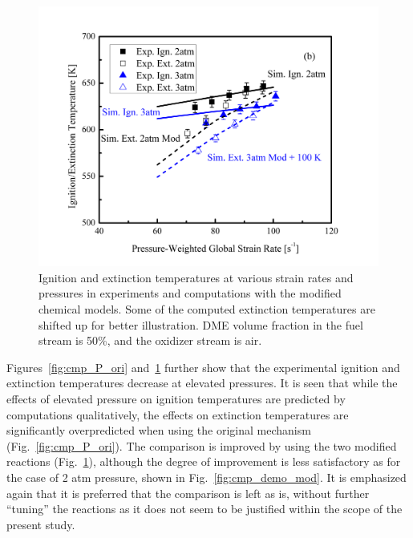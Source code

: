 \begin{figure}[t]
  \centering
  \scriptsize
  \includegraphics[width=1.0\textwidth]{ch-NTC/cmp_P_mod.png}
  \normalsize
  \caption{Ignition and extinction temperatures at various strain rates and pressures in experiments and computations with the modified chemical models.  Some of the computed extinction temperatures are shifted up for better illustration.  DME volume fraction in the fuel stream is 50\%, and the oxidizer stream is air.}
  \label{fig:cmp_P_mod}
\end{figure}

Figures~\ref{fig:cmp_P_ori} and~\ref{fig:cmp_P_mod} further show that the experimental ignition and extinction temperatures decrease at elevated pressures.  It is seen that while the effects of elevated pressure on ignition temperatures are predicted by computations qualitatively, the effects on extinction temperatures are significantly overpredicted when using the original mechanism (Fig.~\ref{fig:cmp_P_ori}).  The comparison is improved by using the two modified reactions (Fig.~\ref{fig:cmp_P_mod}), although the degree of improvement is less satisfactory as for the case of 2 atm pressure, shown in Fig.~\ref{fig:cmp_demo_mod}. It is emphasized again that it is preferred that the comparison is left as is, without further “tuning” the reactions as it does not seem to be justified within the scope of the present study. 

